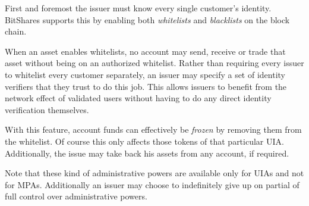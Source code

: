 First and foremost the issuer must know every single customer's identity.
BitShares supports this by enabling both \emph{whitelists} and
\emph{blacklists} on the block chain. 

When an asset enables whitelists, no account may send, receive or trade that
asset without being on an authorized whitelist. Rather than requiring every
issuer to whitelist every customer separately, an issuer may specify a set of
identity verifiers that they trust to do this job. This allows issuers to
benefit from the network effect of validated users without having to do any
direct identity verification themselves.

With this feature, account funds can effectively be \emph{frozen} by removing
them from the whitelist. Of course this only affects those tokens of that
particular UIA. Additionally, the issue may take back his assets from any
account, if required.

Note that these kind of administrative powers are available only for UIAs and
not for MPAs. Additionally an issuer may choose to indefinitely give up on
partial of full control over administrative powers.
